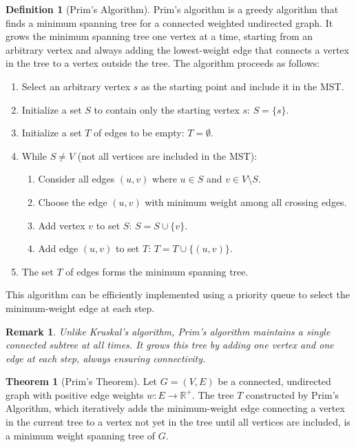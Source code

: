 \documentclass{article}
\newtheorem{remark}{Remark}
\theoremstyle{definition}
\newtheorem{theorem}{Theorem}
\newtheorem{definition}{Definition}
\begin{document}
\begin{definition}[Prim's Algorithm]
Prim's algorithm is a greedy algorithm that finds a minimum spanning tree for a connected weighted undirected graph. It grows the minimum spanning tree one vertex at a time, starting from an arbitrary vertex and always adding the lowest-weight edge that connects a vertex in the tree to a vertex outside the tree. The algorithm proceeds as follows:
\begin{enumerate}
\item Select an arbitrary vertex $s$ as the starting point and include it in the MST.
\item Initialize a set $S$ to contain only the starting vertex $s$: $S = \{s\}$.
\item Initialize a set $T$ of edges to be empty: $T = \emptyset$.
\item While $S \neq V$ (not all vertices are included in the MST):
   \begin{enumerate}
   \item Consider all edges $(u,v)$ where $u \in S$ and $v \in V \setminus S$.
   \item Choose the edge $(u,v)$ with minimum weight among all crossing edges.
   \item Add vertex $v$ to set $S$: $S = S \cup \{v\}$.
   \item Add edge $(u,v)$ to set $T$: $T = T \cup \{(u,v)\}$.
   \end{enumerate}
\item The set $T$ of edges forms the minimum spanning tree.
\end{enumerate}
This algorithm can be efficiently implemented using a priority queue to select the minimum-weight edge at each step.
\end{definition}

\begin{remark}
Unlike Kruskal's algorithm, Prim's algorithm maintains a single connected subtree at all times. It grows this tree by adding one vertex and one edge at each step, always ensuring connectivity.
\end{remark}

\begin{theorem}[Prim's Theorem]
Let $G = (V, E)$ be a connected, undirected graph with positive edge weights $w: E \rightarrow \mathbb{R}^+$. The tree $T$ constructed by Prim's Algorithm, which iteratively adds the minimum-weight edge connecting a vertex in the current tree to a vertex not yet in the tree until all vertices are included, is a minimum weight spanning tree of $G$.
\end{theorem}
\end{document}
